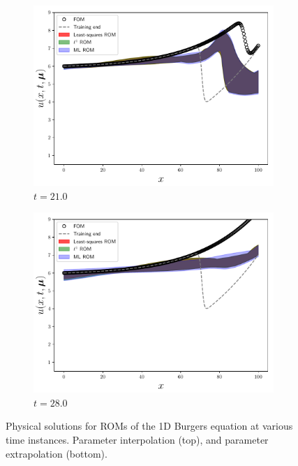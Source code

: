 \documentclass[3p,computermodern,10pt]{elsarticle}
\begin{document}
\begin{figure}
\begin{center}
\begin{subfigure}[t]{0.24\textwidth}
\includegraphics[trim={0cm 0cm 0cm 0cm},clip,width=1.0\linewidth]{code/burgers/synapse_models/elu/results/usolExtrapolate2_0005.pdf} 
\caption{$t=21.0$}
\end{subfigure}
\begin{subfigure}[t]{0.24\textwidth}
\includegraphics[trim={0cm 0cm 0cm 0cm},clip,width=1.0\linewidth]{code/burgers/synapse_models/elu/results/usolExtrapolate2_0007.pdf} 
\caption{$t=28.0$}
\end{subfigure}

\caption{Physical solutions for ROMs of the 1D Burgers equation at various time instances. Parameter interpolation (top), and parameter extrapolation (bottom).}
\label{fig:burg_phys_space}
\end{center}
\end{figure}
\end{document}
